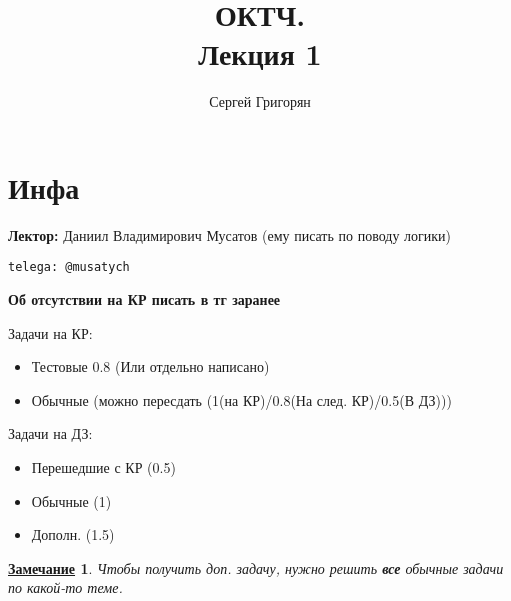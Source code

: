 \documentclass[12pt]{article}
\title{ОКТЧ. \\ Лекция 1}
\author{Сергей Григорян}
\newtheorem*{note}{\underline{Замечание}}
\theoremstyle{definition}
\theoremstyle{definition}
\begin{document}
\maketitle
\newpage
\section{Инфа}
\textbf{Лектор:} Даниил Владимирович Мусатов (ему писать по поводу логики)
\begin{verbatim}
telega: @musatych
\end{verbatim}
\textbf{Об отсутствии на КР писать в тг заранее}

Задачи на КР:
\begin{itemize}
    \item Тестовые 0.8 (Или отдельно написано)
    \item Обычные (можно пересдать (1(на КР)/0.8(На след. КР)/0.5(В ДЗ)))
\end{itemize}

Задачи на ДЗ:
\begin{itemize}
    \item Перешедшие с КР (0.5)
    \item Обычные (1)
    \item Дополн. (1.5)
\end{itemize}
\begin{note}
Чтобы получить доп. задачу, нужно решить \textbf{все} обычные задачи по какой-то теме.
\end{note}
\end{document}
